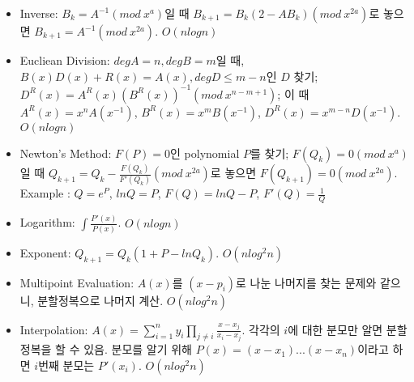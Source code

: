 \begin{itemize}
    \item Inverse: $B_k = A^{-1} (mod \ x^a)$일 때 $B_{k+1}=B_k (2-A B_k ) (mod \ x^{2a})$로 놓으면 $B_{k+1}=A^{-1} (mod \ x^{2a})$. $O(nlogn)$
    \item Eucliean Division: $deg A = n, deg B = m$일 때, $B(x)D(x)+R(x)=A(x), deg D \le m - n$인 $D$ 찾기; $D^R(x) = A^R(x)(B^R(x))^{-1} (mod \ x^{n-m+1})$; 이 때 $A^R(x) = x^n A(x^{-1})$, $B^R(x) = x^m B(x^{-1})$, $D^R(x) = x^{m-n} D(x^{-1})$. $O(nlogn)$
    \item Newton's Method: $F(P)=0$인 polynomial $P$를 찾기; $F(Q_k)=0 (mod \ x^a )$일 때 $Q_{k+1}=Q_k - \frac{F(Q_k)}{F'(Q_k)} (mod \ x^{2a})$로 놓으면 $F(Q_{k+1})=0 (mod \ x^{2a})$. \\
    Example : $Q = e^P$, $ln Q = P$, $F(Q) = ln Q - P$, $F'(Q) = \frac{1}{Q}$
    \item Logarithm: $\int \frac{P'(x)}{P(x)}$. $O(nlogn)$
    \item Exponent: $Q_{k+1} = Q_k (1 + P - ln Q_k )$. $O(nlog^2 n)$
    \item Multipoint Evaluation: $A(x)$를 $(x-p_i )$로 나눈 나머지를 찾는 문제와 같으니, 분할정복으로 나머지 계산. $O(nlog^2 n)$
    \item Interpolation: $A(x) = \sum_{i=1}^n{y_i \prod_{j\neq i}{\frac{x-x_j}{x_i - x_j}}}$. 각각의 $i$에 대한 분모만 알면 분할정복을 할 수 있음. 분모를 알기 위해 $P(x)=(x-x_1) ... (x-x_n)$이라고 하면 $i$번째 분모는 $P'(x_i)$. $O(nlog^2n)$
\end{itemize}